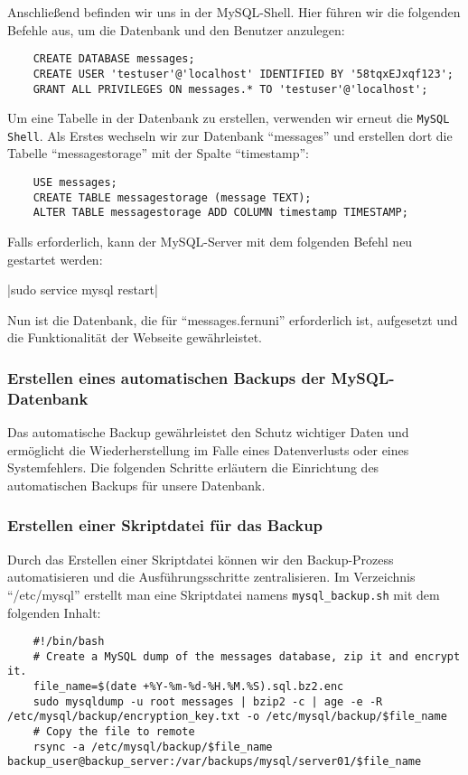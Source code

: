 Anschließend befinden wir uns in der MySQL-Shell. Hier führen wir die folgenden Befehle aus, um die Datenbank und den Benutzer anzulegen:

\begin{verbatim}
    CREATE DATABASE messages;
    CREATE USER 'testuser'@'localhost' IDENTIFIED BY '58tqxEJxqf123';
    GRANT ALL PRIVILEGES ON messages.* TO 'testuser'@'localhost';
\end{verbatim}

Um eine Tabelle in der Datenbank zu erstellen, verwenden wir erneut die \verb+MySQL Shell+.
Als Erstes wechseln wir zur Datenbank \enquote{messages} und erstellen dort die Tabelle \enquote{messagestorage} mit der Spalte \enquote{timestamp}:

\begin{verbatim}
    USE messages;
    CREATE TABLE messagestorage (message TEXT);
    ALTER TABLE messagestorage ADD COLUMN timestamp TIMESTAMP;
\end{verbatim}

Falls erforderlich, kann der MySQL-Server mit dem folgenden Befehl neu gestartet werden:

|sudo service mysql restart|

Nun ist die Datenbank, die für \enquote{messages.fernuni} erforderlich ist, aufgesetzt und die Funktionalität der Webseite gewährleistet.

\subsubsection*{Erstellen eines automatischen Backups der MySQL-Datenbank}

Das automatische Backup gewährleistet den Schutz wichtiger Daten und ermöglicht die Wiederherstellung im Falle eines Datenverlusts oder eines Systemfehlers. Die folgenden Schritte erläutern die Einrichtung des automatischen Backups für unsere Datenbank.

\subsubsection*{Erstellen einer Skriptdatei für das Backup}

Durch das Erstellen einer Skriptdatei können wir den Backup-Prozess automatisieren und die Ausführungsschritte zentralisieren.
Im Verzeichnis \enquote{/etc/mysql} erstellt man eine Skriptdatei namens \verb+mysql_backup.sh+ mit dem folgenden Inhalt:

\begin{verbatim}
    #!/bin/bash
    # Create a MySQL dump of the messages database, zip it and encrypt it.
    file_name=$(date +%Y-%m-%d-%H.%M.%S).sql.bz2.enc
    sudo mysqldump -u root messages | bzip2 -c | age -e -R /etc/mysql/backup/encryption_key.txt -o /etc/mysql/backup/$file_name
    # Copy the file to remote
    rsync -a /etc/mysql/backup/$file_name backup_user@backup_server:/var/backups/mysql/server01/$file_name
\end{verbatim}

